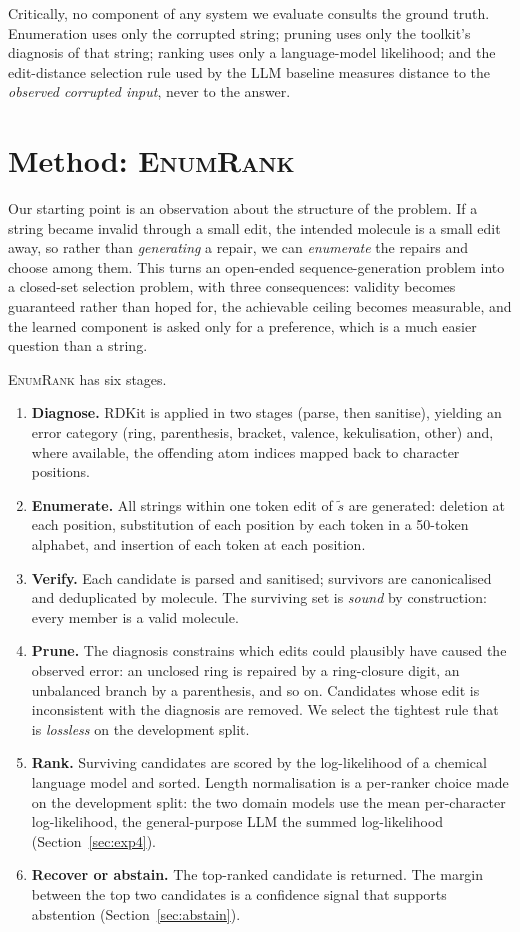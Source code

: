 \documentclass[conference]{IEEEtran}
\newcommand{\ours}{\textsc{EnumRank}}
\begin{document}
Critically, no component of any system we evaluate consults the ground truth.
Enumeration uses only the corrupted string; pruning uses only the toolkit's
diagnosis of that string; ranking uses only a language-model likelihood; and the
edit-distance selection rule used by the LLM baseline measures distance to the
\emph{observed corrupted input}, never to the answer.

\section{Method: \ours{}}\label{sec:method}

Our starting point is an observation about the structure of the problem. If a
string became invalid through a small edit, the intended molecule is a small
edit away, so rather than \emph{generating} a repair, we can \emph{enumerate}
the repairs and choose among them. This turns an open-ended sequence-generation
problem into a closed-set selection problem, with three consequences: validity
becomes guaranteed rather than hoped for, the achievable ceiling becomes
measurable, and the learned component is asked only for a preference, which is a
much easier question than a string.

\ours{} has six stages.

\begin{enumerate}\itemsep3pt
\item \textbf{Diagnose.} RDKit is applied in two stages (parse, then sanitise),
  yielding an error category (ring, parenthesis, bracket, valence,
  kekulisation, other) and, where available, the offending atom indices mapped
  back to character positions.
\item \textbf{Enumerate.} All strings within one token edit of $\tilde{s}$ are
  generated: deletion at each position, substitution of each position by each
  token in a 50-token alphabet, and insertion of each token at each position.
\item \textbf{Verify.} Each candidate is parsed and sanitised; survivors are
  canonicalised and deduplicated by molecule. The surviving set is \emph{sound}
  by construction: every member is a valid molecule.
\item \textbf{Prune.} The diagnosis constrains which edits could plausibly have
  caused the observed error: an unclosed ring is repaired by a ring-closure
  digit, an unbalanced branch by a parenthesis, and so on. Candidates whose edit
  is inconsistent with the diagnosis are removed. We select the tightest rule
  that is \emph{lossless} on the development split.
\item \textbf{Rank.} Surviving candidates are scored by the log-likelihood of a
  chemical language model and sorted. Length normalisation is a per-ranker
  choice made on the development split: the two domain models use the mean
  per-character log-likelihood, the general-purpose LLM the summed
  log-likelihood (Section~\ref{sec:exp4}).
\item \textbf{Recover or abstain.} The top-ranked candidate is returned. The margin
  between the top two candidates is a confidence signal that supports
  abstention (Section~\ref{sec:abstain}).
\end{enumerate}
\end{document}
